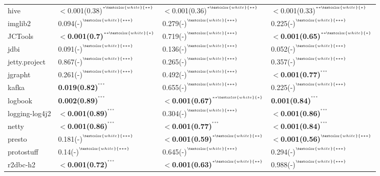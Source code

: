 \begin{tabular}{llll}
hive                &  $<$0.001(0.38)\tiny{$^{^{*\textcolor{white}{**}}}$} &  $<$0.001(0.36)\tiny{$^{^{*\textcolor{white}{**}}}$} &  $<$0.001(0.33)\tiny{$^{^{**\textcolor{white}{*}}}$} \\
imglib2             &  0.094(-)\tiny{$^{^{\textcolor{white}{***}}}$} &  0.279(-)\tiny{$^{^{\textcolor{white}{***}}}$} &  0.225(-)\tiny{$^{^{\textcolor{white}{***}}}$} \\
JCTools             &  \textbf{$<$0.001(0.7)}\tiny{$^{^{**\textcolor{white}{*}}}$} &  0.719(-)\tiny{$^{^{\textcolor{white}{***}}}$} &  \textbf{$<$0.001(0.65)}\tiny{$^{^{**\textcolor{white}{*}}}$} \\
jdbi                &  0.091(-)\tiny{$^{^{\textcolor{white}{***}}}$} &  0.136(-)\tiny{$^{^{\textcolor{white}{***}}}$} &  0.052(-)\tiny{$^{^{\textcolor{white}{***}}}$} \\
jetty.project       &  0.867(-)\tiny{$^{^{\textcolor{white}{***}}}$} &  0.265(-)\tiny{$^{^{\textcolor{white}{***}}}$} &  0.357(-)\tiny{$^{^{\textcolor{white}{***}}}$} \\
jgrapht             &  0.261(-)\tiny{$^{^{\textcolor{white}{***}}}$} &  0.492(-)\tiny{$^{^{\textcolor{white}{***}}}$} &  \textbf{$<$0.001(0.77)}\tiny{$^{^{***}}$} \\
kafka               &  \textbf{0.019(0.82)}\tiny{$^{^{***}}$} &  0.655(-)\tiny{$^{^{\textcolor{white}{***}}}$} &  0.225(-)\tiny{$^{^{\textcolor{white}{***}}}$} \\
logbook             &  \textbf{0.002(0.89)}\tiny{$^{^{***}}$} &  \textbf{$<$0.001(0.67)}\tiny{$^{^{**\textcolor{white}{*}}}$} &  \textbf{0.001(0.84)}\tiny{$^{^{***}}$} \\
logging-log4j2      &  \textbf{$<$0.001(0.89)}\tiny{$^{^{***}}$} &  0.304(-)\tiny{$^{^{\textcolor{white}{***}}}$} &  \textbf{$<$0.001(0.86)}\tiny{$^{^{***}}$} \\
netty               &  \textbf{$<$0.001(0.86)}\tiny{$^{^{***}}$} &  \textbf{$<$0.001(0.77)}\tiny{$^{^{***}}$} &  \textbf{$<$0.001(0.84)}\tiny{$^{^{***}}$} \\
presto              &  0.181(-)\tiny{$^{^{\textcolor{white}{***}}}$} &  \textbf{$<$0.001(0.59)}\tiny{$^{^{*\textcolor{white}{**}}}$} &  \textbf{$<$0.001(0.56)}\tiny{$^{^{\textcolor{white}{***}}}$} \\
protostuff          &  0.14(-)\tiny{$^{^{\textcolor{white}{***}}}$} &  0.645(-)\tiny{$^{^{\textcolor{white}{***}}}$} &  0.294(-)\tiny{$^{^{\textcolor{white}{***}}}$} \\
r2dbc-h2            &  \textbf{$<$0.001(0.72)}\tiny{$^{^{***}}$} &  \textbf{$<$0.001(0.63)}\tiny{$^{^{*\textcolor{white}{**}}}$} &  0.988(-)\tiny{$^{^{\textcolor{white}{***}}}$} \\

\end{tabular}
